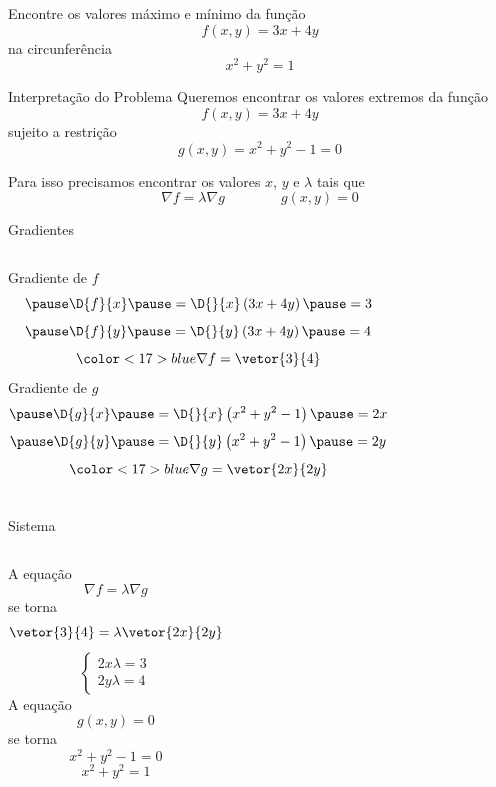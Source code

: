 \begin{question}
  Encontre os valores máximo e mínimo da função
  \[
    f(x, y) = 3x + 4y
  \]
  na circunferência
  \[
    x^2 + y^2 = 1
  \]
\end{question}

\begin{resolution}{Interpretação do Problema}
  Queremos encontrar os valores extremos da função
  \[
    f(x, y) = 3x + 4y
  \]
  \pause
  sujeito a restrição
  \[
    g(x, y) = x^2 + y^2 - 1 = 0
  \]

  \pause
  Para isso precisamos encontrar os valores $x$, $y$ e $\lambda$ tais que
  \[
    \nabla f = \lambda \nabla g
    \qquad\qquad
    g(x, y) = 0
  \]
\end{resolution}

\begin{resolution}{Gradientes}
\begin{columns}
  Gradiente de $f$
  \[
    \pause
    \D{f}{x}
    \pause
    = \D{}{x}\left(3x + 4y\right)
    \pause
    = 3
  \]
  \[
    \pause
    \D{f}{y}
    \pause
    = \D{}{y}\left(3x + 4y\right)
    \pause
    = 4
  \]
  \pause
  \[
    {\color<17>{blue}\nabla f = \vetor{3}{4}}
  \]
  \pause
  Gradiente de $g$
  \[
    \pause
    \D{g}{x}
    \pause
    = \D{}{x}\left(x^2 + y^2 - 1\right)
    \pause
    = 2x
  \]
  \[
    \pause
    \D{g}{y}
    \pause
    = \D{}{y}\left(x^2 + y^2 - 1\right)
    \pause
    = 2y
  \]
  \pause
  \[
    {\color<17>{blue}\nabla g = \vetor{2x}{2y}}
  \]
\end{columns}
\end{resolution}

\begin{resolution}{Sistema}
\begin{columns}[t]
  A equação
  \[
    \nabla f = \lambda \nabla g
  \]
  \pause
  se torna
  \[
    \vetor{3}{4} = \lambda \vetor{2x}{2y}
  \]
  {%
    \pause
    \[
    \begin{cases}
      2x\lambda = 3 \\
      2y\lambda = 4
    \end{cases}
  \]}
  \pause
  A equação
  \[
    g(x, y) = 0
  \]
  \pause
  se torna
  \[
    x^2 + y^2 - 1 = 0
  \]
  {%
    \pause
  \[
    x^2 + y^2 = 1
  \]}
\end{columns}
\end{resolution}

